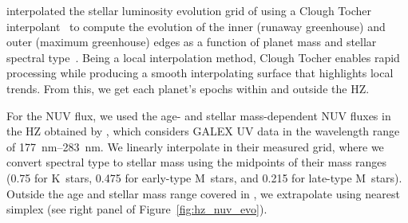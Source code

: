 \documentclass[twocolumn,twocolappendix,linenumbers]{aastex631}
\begin{document}

 interpolated the stellar luminosity evolution grid of \citet{Baraffe1998} using a Clough Tocher interpolant~\citep[][see left panel of Figure~\ref{fig:hz_nuv_evo}]{Nielson1983,Alfeld1984} to compute the evolution of the inner (runaway greenhouse) and outer (maximum greenhouse) edges as a function of planet mass and stellar spectral type~\citep{Kopparapu2014}.
Being a local interpolation method, Clough Tocher enables rapid processing while producing a smooth interpolating surface that highlights local trends.
From this, we get each planet's epochs within and outside the \gls{HZ}.



For the \gls{NUV} flux, we used the age- and stellar mass-dependent \gls{NUV} fluxes in the \gls{HZ} obtained by \citet{Richey-Yowell2023}, which considers GALEX \gls{UV} data in the wavelength range of \SIrange{177}{283}{\nano\meter}.
We linearly interpolate in their measured grid, where we convert spectral type to stellar mass using the midpoints of their mass ranges (\SI{0.75}{\Msun} for K~stars, \SI{0.475}{\Msun} for early-type M~stars,  and \SI{0.215}{\Msun} for late-type M~stars).
Outside the age and stellar mass range covered in \citet{Richey-Yowell2023}, we extrapolate using nearest simplex (see right panel of Figure~\ref{fig:hz_nuv_evo}).
\end{document}
